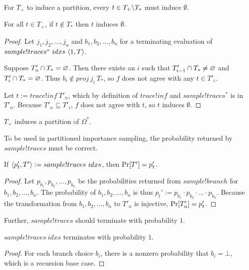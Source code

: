 For $T_+$ to induce a partition, every $t \in T_+ \backslash T_*$ must induce $\emptyset$.

\begin{theorem}
For all $t \in T_+$, if $t \notin T_*$ then $t$ induces $\emptyset$.
\end{theorem}
\begin{proof}
Let $j_1,j_2,...,j_n$ and $b_1,b_2,...,b_n$ for a terminating evaluation of $sample!traces^*~idxs~\langle{1,T}\rangle$.

Suppose $T'_n \cap T_* = \varnothing$.
Then there exists an $i$ such that $T'_{i-1} \cap T_* \neq \varnothing$ and $T'_i \cap T_* = \varnothing$.
Thus $b_i \notin proj~j_i~T_*$, so $f$ does not agree with any $t \in T'_i$.

Let $t := trace!inf~T'_n$, which by definition of $trace!inf$ and $sample!traces^*$ is in $T'_n$.
Because $T'_n \subseteq T'_i$, $f$ does not agree with $t$, so $t$ induces $\emptyset$.
\end{proof}

\begin{corollary}
$T_+$ induces a partition of $\Omega^*$.
\end{corollary}


To be used in partitioned importance sampling, the probability returned by $sample!traces$ must be correct.

\begin{theorem}
If $\langle{p_t',T'}\rangle := sample!traces~idxs$, then $\mathrm{Pr}\!\left[{T'}\right] = p_t'$.
\end{theorem}
\begin{proof}
Let $p_{b_1},p_{b_2},...,p_{b_n}$ be the probabilities returned from $sample!branch$ for $b_1,b_2,...,b_n$.
The probability of $b_1,b_2,...,b_n$ is thus $p_t' := p_{b_1} \cdot p_{b_2} \cdot ... \cdot p_{b_n}$.
Because the transformation from $b_1,b_2,...,b_n$ to $T'_n$ is injective, $\mathrm{Pr}\!\left[{T'_n}\right] = p_t'$.
\end{proof}

Further, $sample!traces$ should terminate with probability $1$.

\begin{theorem}
$sample!traces~idxs$ terminates with probability $1$.
\end{theorem}
\begin{proof}
For each branch choice $b_i$, there is a nonzero probability that $b_i = \bot$, which is a recursion base case.
\end{proof}


